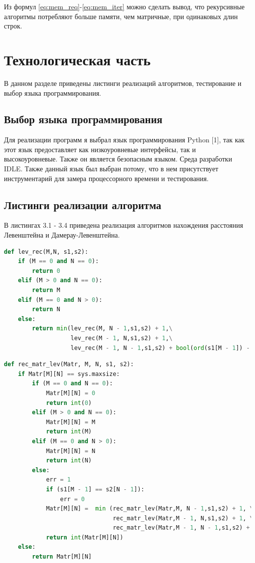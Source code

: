 \documentclass[14pt,russian]{scrartcl}
\begin{document}
	Из формул \ref{eq:mem_req}-\ref{eq:mem_iter} можно сделать вывод, что рекурсивные алгоритмы потребляют больше памяти, чем матричные, при одинаковых длин строк.
\section{Технологическая часть}

В данном разделе приведены листинги реализаций алгоритмов, тестирование и выбор языка программирования.


\subsection{Выбор языка программирования}
Для реализации программ я выбрал язык программирования Python [1], так как этот язык предоставляет как низкоуровневые интерфейсы, так и высокоуровневые. Также он является безопасным языком. Среда разработки IDLE. Также данный язык был выбран потому, что в нем присутствует инструментарий для замера процессорного времени и тестирования.

\subsection{Листинги реализации алгоритма}
В листингах 3.1 - 3.4 приведена реализация алгоритмов нахождения расстояния Левенштейна и Дамерау-Левенштейна.

\begin{lstlisting}[label=some-code,caption=Функция нахождения расстояния Левенштейна рекурсивно,language=Python]
def lev_rec(M,N, s1,s2):
    if (M == 0 and N == 0):
        return 0
    elif (M > 0 and N == 0):
        return M
    elif (M == 0 and N > 0):
        return N
    else:
        return min(lev_rec(M, N - 1,s1,s2) + 1,\
                   lev_rec(M - 1, N,s1,s2) + 1,\
                   lev_rec(M - 1, N - 1,s1,s2) + bool(ord(s1[M - 1]) - ord(s2[N - 1])))
\end{lstlisting}
\clearpage

\begin{lstlisting}[label=some-code,caption=Функция нахождения расстояние Левенштейна рекурсивно с меморизацией,language=Python]
def rec_matr_lev(Matr, M, N, s1, s2):
    if Matr[M][N] == sys.maxsize:
        if (M == 0 and N == 0):
            Matr[M][N] = 0
            return int(0)
        elif (M > 0 and N == 0):
            Matr[M][N] = M
            return int(M)
        elif (M == 0 and N > 0):
            Matr[M][N] = N
            return int(N)
        else:
            err = 1
            if (s1[M - 1] == s2[N - 1]):
                err = 0
            Matr[M][N] =  min (rec_matr_lev(Matr,M, N - 1,s1,s2) + 1, \
                               rec_matr_lev(Matr,M - 1, N,s1,s2) + 1, \
                               rec_matr_lev(Matr,M - 1, N - 1,s1,s2) + err)
            return int(Matr[M][N])
    else:
        return Matr[M][N]
\end{lstlisting}
\end{document}
